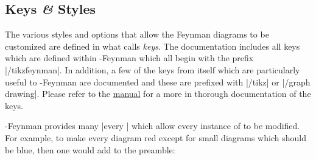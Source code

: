 \documentclass[a4paper,final]{ltxdoc}
\providecommand{\tikzfeynmanname}{\tikzname-Feynman}
\providecommand{\pgfmanual}{\href{http://mirrors.ctan.org/graphics/pgf/base/doc/pgfmanual.pdf}{\tikzname{} manual}}
\begin{document}
\subsection{Keys \emph{\&} Styles}
\label{subsec:Keys}

The various styles and options that allow the Feynman diagrams to be customized
are defined in what \tikzname{} calls \emph{keys}.  The documentation includes
all keys which are defined within \tikzfeynmanname{} which all begin with the
prefix |/tikzfeynman|.  In addition, a few of the keys from \tikzname{} itself
which are particularly useful to \tikzfeynmanname{} are documented and these are
prefixed with |/tikz| or |/graph drawing|.  Please refer to the \pgfmanual{} for
a more in thorough documentation of the \tikzname{} keys.


\tikzfeynmanname{} provides many |every | which allow every instance
of  to be modified.  For example, to make every diagram red except for
small diagrams which should be blue, then one would add to the preamble:
\end{document}
